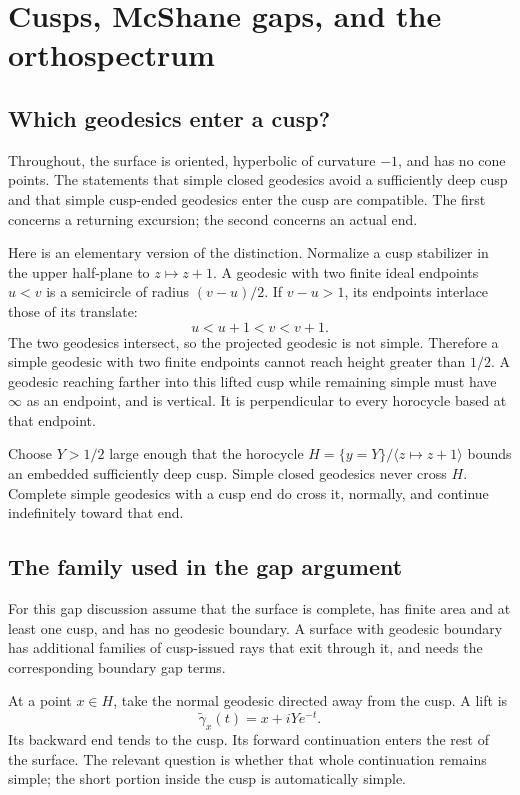 \section{Cusps, McShane gaps, and the orthospectrum}
\label{sec:cusps}

\subsection{Which geodesics enter a cusp?}

Throughout, the surface is oriented, hyperbolic of curvature $-1$, and
has no cone points. The statements that simple closed geodesics avoid a sufficiently deep cusp
and that simple cusp-ended geodesics enter the cusp are compatible. The
first concerns a returning excursion; the second concerns an actual end.

Here is an elementary version of the distinction. Normalize a cusp
stabilizer in the upper half-plane to $z\mapsto z+1$. A geodesic with two
finite ideal endpoints $u<v$ is a semicircle of radius $(v-u)/2$. If
$v-u>1$, its endpoints interlace those of its translate:
\[
 u<u+1<v<v+1.
\]
The two geodesics intersect, so the projected geodesic is not simple.
Therefore a simple geodesic with two finite endpoints cannot reach height
greater than $1/2$. A geodesic reaching farther into this lifted cusp
while remaining simple must have $\infty$ as an endpoint, and is vertical.
It is perpendicular to every horocycle based at that endpoint.

Choose $Y>1/2$ large enough that the horocycle $H=\{y=Y\}/\langle z\mapsto
z+1\rangle$ bounds an embedded sufficiently deep cusp. Simple closed
geodesics never cross $H$. Complete simple geodesics with a cusp end do
cross it, normally, and continue indefinitely toward that end.

\subsection{The family used in the gap argument}

For this gap discussion assume that the surface is complete, has finite
area and at least one cusp, and has no geodesic boundary. A surface with
geodesic boundary has additional families of cusp-issued rays that exit
through it, and needs the corresponding boundary gap terms.

At a point $x\in H$, take the normal geodesic directed away from the
cusp. A lift is
\begin{equation}
 \widetilde\gamma_x(t)=x+iYe^{-t}.
 \label{eq:cuspray}
\end{equation}
Its backward end tends to the cusp. Its forward continuation enters the
rest of the surface. The relevant question is whether that whole
continuation remains simple; the short portion inside the cusp is
automatically simple.

